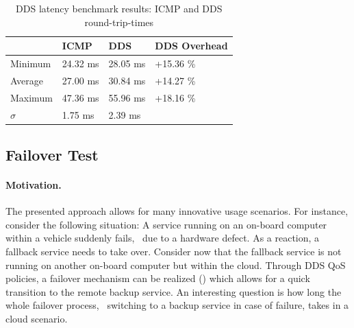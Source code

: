 \begin{table}[H]
  \caption[DDS latecy benchmark results]{DDS latency benchmark results: ICMP and DDS round-trip-times}\label{tab:dds-latency}
  \centering
  \begin{tabular}{p{} | p{} p{} | p{}}
    \toprule
       & \textbf{ICMP} & \textbf{DDS} & \textbf{DDS Overhead} \\
    \midrule
    	Minimum & 24.32 ms & 28.05 ms & +15.36 \%\\
    	Average & 27.00 ms & 30.84 ms & +14.27 \%\\
    	Maximum & 47.36 ms & 55.96 ms & +18.16 \% \\
    	$\sigma$ & 1.75 ms & 2.39 ms &\\
    \bottomrule
  \end{tabular}
\end{table}
%
%
%
%
%
%
%
%
%
%
\subsection{Failover Test}\label{sec:failovertest}
\paragraph{Motivation.} The presented approach allows for many innovative usage scenarios. For instance, consider the following situation: A service running on an on-board computer within a vehicle suddenly fails, \eg\ due to a hardware defect. As a reaction, a fallback service needs to take over. Consider now that the fallback service is not running on another on-board computer but within the cloud. Through DDS QoS policies, a failover mechanism can be realized (\cf {}) which allows for a quick transition to the remote backup service. An interesting question is how long the whole failover process, \ie\ switching to a backup service in case of failure, takes in a cloud scenario.

